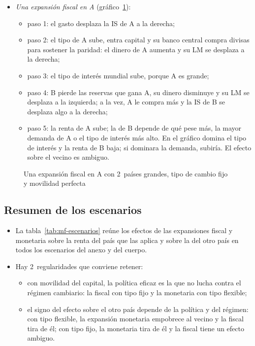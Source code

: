 \documentclass[11pt]{article}
\begin{document}
\begin{itemize}
\item \emph{Una expansión fiscal en A} (gráfico~\ref{fig:mf-dos-paises-fijo-fiscal}):
  \begin{itemize}
  \item paso 1: el gasto desplaza la IS de A a la derecha;
  \item paso 2: el tipo de A sube, entra capital y su banco central compra divisas para sostener la paridad: el dinero de A aumenta y su LM se desplaza a la derecha;
  \item paso 3: el tipo de interés mundial sube, porque A es grande;
  \item paso 4: B pierde las reservas que gana A, su dinero disminuye y su LM se desplaza a la izquierda; a la vez, A le compra más y la IS de B se desplaza algo a la derecha;
  \item paso 5: la renta de A sube; la de B depende de qué pese más, la mayor demanda de A o el tipo de interés más alto. En el gráfico domina el tipo de interés y la renta de B baja; si dominara la demanda, subiría. El efecto sobre el vecino es ambiguo.
  \end{itemize}
\end{itemize}

\begin{figure}[H]
\centering
\caption{Una expansión fiscal en A con 2~países grandes, tipo de cambio fijo y movilidad perfecta}\label{fig:mf-dos-paises-fijo-fiscal}
\end{figure}

\subsection*{Resumen de los escenarios}

\begin{itemize}
\item La tabla~\ref{tab:mf-escenarios} reúne los efectos de las expansiones fiscal y monetaria sobre la renta del país que las aplica y sobre la del otro país en todos los escenarios del anexo y del cuerpo.
\item Hay 2~regularidades que conviene retener:
  \begin{itemize}
  \item con movilidad del capital, la política eficaz es la que no lucha contra el régimen cambiario: la fiscal con tipo fijo y la monetaria con tipo flexible;
  \item el signo del efecto sobre el otro país depende de la política y del régimen: con tipo flexible, la expansión monetaria empobrece al vecino y la fiscal tira de él; con tipo fijo, la monetaria tira de él y la fiscal tiene un efecto ambiguo.
  \end{itemize}
\end{itemize}
\end{document}
